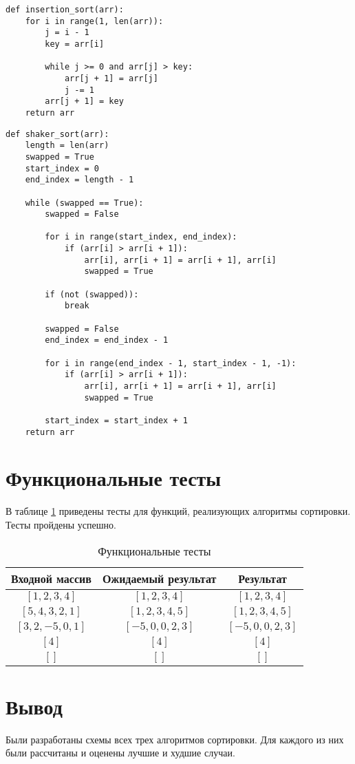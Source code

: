 \begin{lstlisting}[label=lst:vst_sort,caption= Алгоритм сортировки вставками]
def insertion_sort(arr):
	for i in range(1, len(arr)):
		j = i - 1
		key = arr[i]
		
		while j >= 0 and arr[j] > key:
			arr[j + 1] = arr[j]
			j -= 1
		arr[j + 1] = key
	return arr	
\end{lstlisting}

\begin{lstlisting}[label=lst:sheyker_sort,caption=Алгоритм сортировки перемешиванием (или сортировка шейкер)]
def shaker_sort(arr):
	length = len(arr)
	swapped = True
	start_index = 0
	end_index = length - 1
	
	while (swapped == True):
		swapped = False
		
		for i in range(start_index, end_index):
			if (arr[i] > arr[i + 1]):
				arr[i], arr[i + 1] = arr[i + 1], arr[i]
				swapped = True
		
		if (not (swapped)):
			break
		
		swapped = False
		end_index = end_index - 1
		
		for i in range(end_index - 1, start_index - 1, -1):
			if (arr[i] > arr[i + 1]):
				arr[i], arr[i + 1] = arr[i + 1], arr[i]
				swapped = True
			
		start_index = start_index + 1
	return arr
\end{lstlisting}

\section{Функциональные тесты}

В таблице \ref{tbl:functional_test} приведены тесты для функций, реализующих алгоритмы сортировки. Тесты пройдены успешно.


\begin{table}[h]
	\begin{center}
		\caption{\label{tbl:functional_test} Функциональные тесты}
		\begin{tabular}{|c|c|c|}
			\hline
			Входной массив & Ожидаемый результат & Результат \\ 
			\hline
			$[1,2,3,4]$ & $[1,2,3,4]$  & $[1,2,3,4]$\\
			$[5,4,3,2,1]$  & $[1,2,3,4,5]$ & $[1,2,3,4,5]$\\
			$[3,2,-5,0,1]$  & $[-5,0,0,2,3]$  & $[-5,0,0,2,3]$\\
			$[4]$  & $[4]$  & $[4]$\\
			$[]$  & $[]$  & $[]$\\
			\hline
		\end{tabular}
	\end{center}
\end{table}


\section*{Вывод}

Были разработаны схемы всех трех алгоритмов сортировки. Для каждого из них были рассчитаны и оценены лучшие и худшие случаи.
